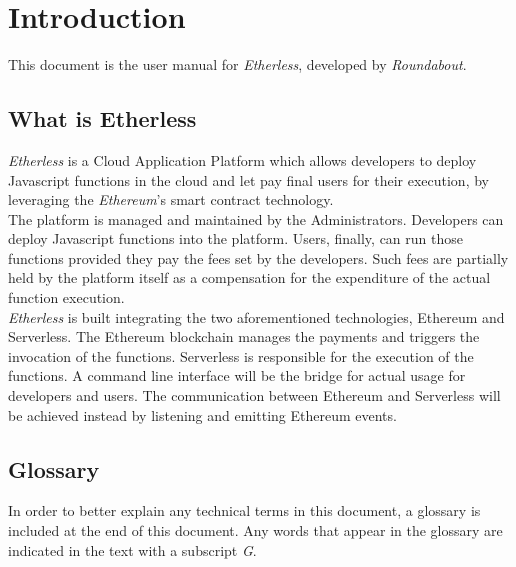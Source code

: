 \section{Introduction}
This document is the user manual for \textit{Etherless}, developed by \textit{Roundabout}.
\subsection{What is Etherless}
\textit{Etherless} is a Cloud Application Platform which allows developers to deploy Javascript functions in the cloud and let pay final users for their execution, by leveraging the \textit{Ethereum}'s smart contract technology.\\
The platform is managed and maintained by the Administrators.
Developers can deploy Javascript functions into the platform. Users, finally, can run those functions provided they pay the fees set by the developers. Such fees are partially held by the platform itself as a compensation for the expenditure of the actual function execution.\\
\textit{Etherless} is built integrating the two aforementioned technologies, Ethereum and Serverless. The Ethereum blockchain manages the payments and triggers the invocation of the functions. Serverless is responsible for the execution of the functions. A command line interface will be the bridge for actual usage for developers and users. The communication between Ethereum and Serverless will be achieved instead by listening and emitting Ethereum events.

\subsection{Glossary}
In order to better explain any technical terms in this document, a glossary is included at the end of this document. Any words that appear in the glossary are indicated in the text with a subscript \textit{G}.

